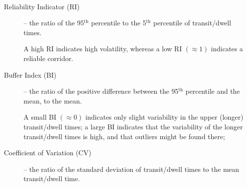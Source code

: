 \documentclass[20pt,landscape,footrule,headrule]{foils}
\begin{document}
\newpage\ \begin{description} 
\item[Reliability Indicator (RI)] -- the ratio of the 95$^{\text{th}}$ percentile to the 5$^{\text{th}}$ percentile of transit/dwell times. \par A high RI indicates high volatility, whereas a low RI $(\approx 1)$ indicates a reliable corridor.
\item[Buffer Index (BI)] -- the ratio of the positive difference between the 95$^{\text{th}}$ percentile and the mean, to the mean. \par A small BI $(\approx 0)$ indicates only slight variability in the upper (longer) transit/dwell times; a large BI indicates that the variability of the longer transit/dwell times is high, and that outliers might be found there;
\item[Coefficient of Variation (CV)] -- the ratio of the standard deviation of transit/dwell times to the mean transit/dwell time.  
\end{description}
\newpage\ \\ 
\end{document}
